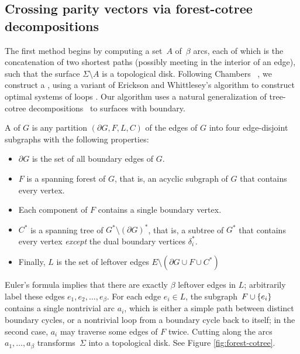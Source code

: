 \documentclass[11pt,twoside]{article}
\begin{document}

\subsection{Crossing parity vectors via forest-cotree decompositions}
\label{sec:characterizing_crossings}

The first method begins by computing a set~$A$ of~$\beta$ arcs, each of which is the concatenation of two shortest paths (possibly meeting in the interior of an edge), such that the surface $\Sigma\setminus A$ is a topological disk.
Following Chambers \etal~\cite{ccelw-scsih-08}, we construct a , using a variant of Erickson and Whittlesey's algorithm to construct optimal systems of loops \cite{ew-gohhg-05}.  Our algorithm uses a natural generalization of tree-cotree decompositions~\cite{e-dgteg-03} to surfaces with boundary.

A  of $G$ is any partition $(\partial\! G, F, L, C)$ of the edges of $G$ into four edge-disjoint subgraphs with the following properties:
\begin{itemize}\itemsep0pt
\item $\partial\! G$ is the set of all boundary edges of $G$.
\item $F$ is a spanning forest of $G$, that is, an acyclic subgraph of $G$ that contains every vertex.
\item Each component of $F$ contains a single boundary vertex.
\item $C^*$ is a spanning tree of $G^*\setminus (\partial G)^*$, that is, a subtree of $G^*$ that contains every vertex \emph{except} the dual boundary vertices $\delta_i^*$.
\item Finally, $L$ is the set of leftover edges $E \setminus (\partial\!G \cup F \cup C^*)$
\end{itemize}

\noindent
Euler's formula implies that there are exactly $\beta$ leftover edges in $L$; arbitrarily label these edges $e_1, e_2, \dots, e_\beta$.  For each edge $e_i\in L$, the subgraph~$F\cup \{ e_i \}$ contains a single nontrivial arc $a_i$, which is either a simple path between distinct boundary cycles, or a nontrivial loop from a boundary cycle back to itself; in the second case, $a_i$ may traverse some edges of $F$ twice.  Cutting along the arcs $a_1, \dots, a_\beta$ transforms~$\Sigma$ into a topological disk. See Figure \ref{fig:forest-cotree}.
\end{document}
